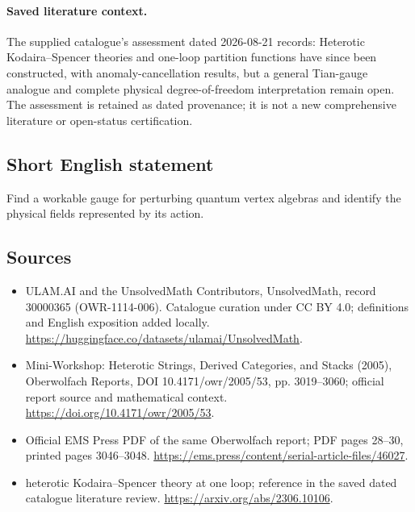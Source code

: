 \documentclass[11pt]{article}
\begin{document}
\paragraph{Saved literature context.} The supplied catalogue's assessment dated 2026-08-21 records: Heterotic Kodaira--Spencer theories and one-loop partition functions have since been constructed, with anomaly-cancellation results, but a general Tian-gauge analogue and complete physical degree-of-freedom interpretation remain open. The assessment is retained as dated provenance; it is not a new comprehensive literature or open-status certification.
\subsection{Short English statement}
Find a workable gauge for perturbing quantum vertex algebras and identify the physical fields represented by its action.
\subsection{Sources}
\begin{itemize}
\item[\hypertarget{source:30000365:1}{S1}] ULAM.AI and the UnsolvedMath Contributors, UnsolvedMath, record 30000365 (OWR-1114-006). Catalogue curation under CC BY 4.0; definitions and English exposition added locally.
\url{https://huggingface.co/datasets/ulamai/UnsolvedMath}.
\item[\hypertarget{source:30000365:2}{S2}] Mini-Workshop: Heterotic Strings, Derived Categories, and Stacks (2005), Oberwolfach Reports, DOI 10.4171/owr/2005/53, pp. 3019--3060; official report source and mathematical context.
\url{https://doi.org/10.4171/owr/2005/53}.
\item[\hypertarget{source:30000365:3}{S3}] Official EMS Press PDF of the same Oberwolfach report; PDF pages 28--30, printed pages 3046--3048.
\url{https://ems.press/content/serial-article-files/46027}.
\item[\hypertarget{source:30000365:4}{S4}] heterotic Kodaira--Spencer theory at one loop; reference in the saved dated catalogue literature review.
\url{https://arxiv.org/abs/2306.10106}.
\end{itemize}
\label{end:30000365}
\end{document}
